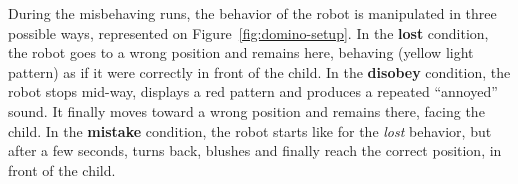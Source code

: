 \documentclass[letterpaper, 10pt, conference]{ieeeconf}
\begin{document}
%
%
%
%
%
%
%
During the misbehaving runs, the behavior of the robot is manipulated in three
possible ways, represented on Figure~\ref{fig:domino-setup}.
In the \textbf{lost} condition, the robot goes to a wrong position and remains here,
behaving (yellow light pattern) as if it were correctly in front of the child.
In the \textbf{disobey} condition, the robot stops mid-way, displays a red
pattern and produces a repeated ``annoyed'' sound. It finally moves toward a
wrong position and remains there, facing the child. In the \textbf{mistake}
condition, the robot starts like for the \emph{lost} behavior, but after a few
seconds, turns back, blushes and finally reach the correct position, in front of
the child.
\end{document}
